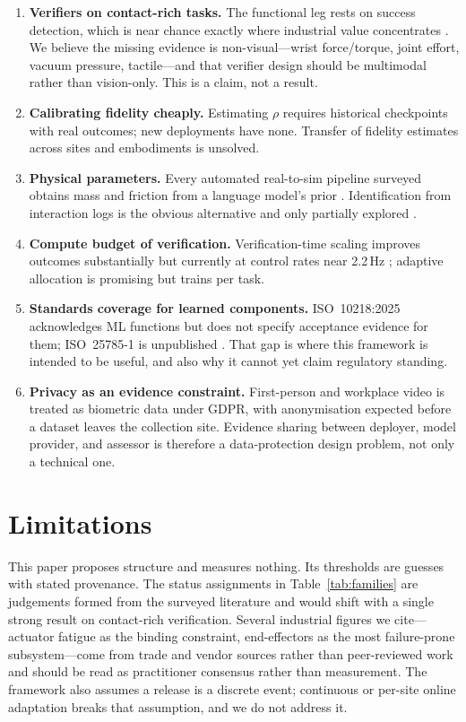 \documentclass[11pt]{article}
\theoremstyle{definition}
\begin{document}
\begin{enumerate}[leftmargin=1.4em]
  \item \textbf{Verifiers on contact-rich tasks.} The functional leg rests on success
  detection, which is near chance exactly where industrial value concentrates
  \citep{failbench}. We believe the missing evidence is non-visual---wrist force/torque,
  joint effort, vacuum pressure, tactile---and that verifier design should be multimodal
  rather than vision-only. This is a claim, not a result.
  \item \textbf{Calibrating fidelity cheaply.} Estimating $\rho$ requires historical
  checkpoints with real outcomes; new deployments have none. Transfer of fidelity estimates
  across sites and embodiments is unsolved.
  \item \textbf{Physical parameters.} Every automated real-to-sim pipeline surveyed obtains
  mass and friction from a language model's prior \citep{simfoundry,robosnap,scanmatsim}.
  Identification from interaction logs is the obvious alternative and only partially explored
  \citep{twinaligner,asid}.
  \item \textbf{Compute budget of verification.} Verification-time scaling improves outcomes
  substantially but currently at control rates near 2.2\,Hz \citep{cover}; adaptive
  allocation is promising \citep{elastic} but trains per task.
  \item \textbf{Standards coverage for learned components.} ISO~10218:2025 acknowledges ML
  functions but does not specify acceptance evidence for them; ISO~25785-1 is unpublished
  \citep{iso25785}. That gap is where this framework is intended to be useful, and also why
  it cannot yet claim regulatory standing.
  \item \textbf{Privacy as an evidence constraint.} First-person and workplace video is
  treated as biometric data under GDPR, with anonymisation expected before a dataset leaves
  the collection site. Evidence sharing between deployer, model provider, and assessor is
  therefore a data-protection design problem, not only a technical one.
\end{enumerate}

\section{Limitations}

This paper proposes structure and measures nothing. Its thresholds are guesses with stated
provenance. The status assignments in Table~\ref{tab:families} are judgements formed from the
surveyed literature and would shift with a single strong result on contact-rich verification.
Several industrial figures we cite---actuator fatigue as the binding constraint,
end-effectors as the most failure-prone subsystem---come from trade and vendor sources rather
than peer-reviewed work and should be read as practitioner consensus rather than measurement.
The framework also assumes a release is a discrete event; continuous or per-site online
adaptation breaks that assumption, and we do not address it.
\end{document}

